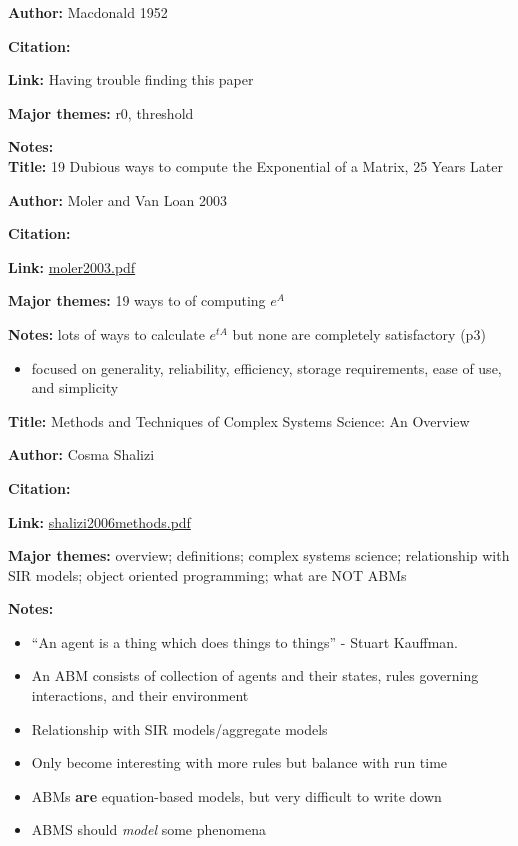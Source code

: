 \message{ !name(refs.tex)}\documentclass{article}
\begin{document}
\textbf{Author:}  Macdonald 1952

\textbf{Citation:} \cite{macdonald1952analysis}

\textbf{Link:} Having trouble finding this paper

\textbf{Major themes:}  r0, threshold

\textbf{Notes:}
\\



\textbf{Title:}  19 Dubious ways to compute the Exponential of a Matrix, 25 Years Later

\textbf{Author:} Moler and Van Loan 2003

\textbf{Citation:}\cite{moler2003}

\textbf{Link:} \url{moler2003.pdf}

\textbf{Major themes:}  19 ways to of computing $e^A$

\textbf{Notes:}  lots of ways to calculate $e^{tA}$ but none are completely satisfactory (p3)

\begin{itemize}
\item focused on generality, reliability, efficiency, storage requirements, ease of use, and simplicity
\end{itemize}

\textbf{Title:} Methods and Techniques of Complex Systems Science:  An Overview

\textbf{Author:} Cosma Shalizi

\textbf{Citation:} \cite{shalizi2006methods}

\textbf{Link:} \url{shalizi2006methods.pdf}

\textbf{Major themes:} overview; definitions; complex systems science; relationship with SIR models; object oriented programming; what are NOT ABMs

\textbf{Notes:}
\begin{itemize}
\item ``An agent is a thing which does things to things'' - Stuart Kauffman.  
\item An ABM consists of collection of agents and their states, rules governing interactions, and their environment
\item Relationship with SIR models/aggregate models
\item Only become interesting with more rules but balance with run time
\item ABMs \textbf{are} equation-based models, but very difficult to write down
\item ABMS should \textit{model} some phenomena 
\end{itemize}
\end{document}
